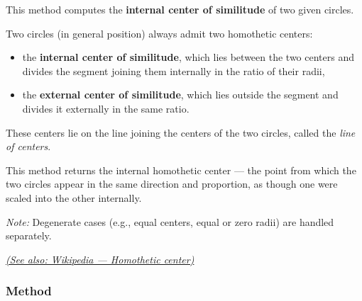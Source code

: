 This method computes the \textbf{internal center of similitude} of two given circles.

\medskip
\noindent
Two circles (in general position) always admit two homothetic centers:
\begin{itemize}
  \item the \textbf{internal center of similitude}, which lies between the two centers and divides the segment joining them internally in the ratio of their radii,
  \item the \textbf{external center of similitude}, which lies outside the segment and divides it externally in the same ratio.
\end{itemize}

\noindent
These centers lie on the line joining the centers of the two circles, called the \emph{line of centers}.

\medskip
\noindent
This method returns the internal homothetic center — the point from which the two circles appear in the same direction and proportion, as though one were scaled into the other internally.

\medskip
\noindent
\emph{Note:} Degenerate cases (e.g., equal centers, equal or zero radii) are handled separately.
\begin{flushright}
\small
\href{https://en.wikipedia.org/wiki/Homothetic_center}{\textit{(See also: Wikipedia — Homothetic center)}}
\end{flushright}

\vspace{1em}


\begin{tkzexample}[latex=.5\textwidth]
 \begin{center}
 \end{center}
\end{tkzexample}

\subsubsection{Method }
\label{ssub:method_circle_external__similitude}


